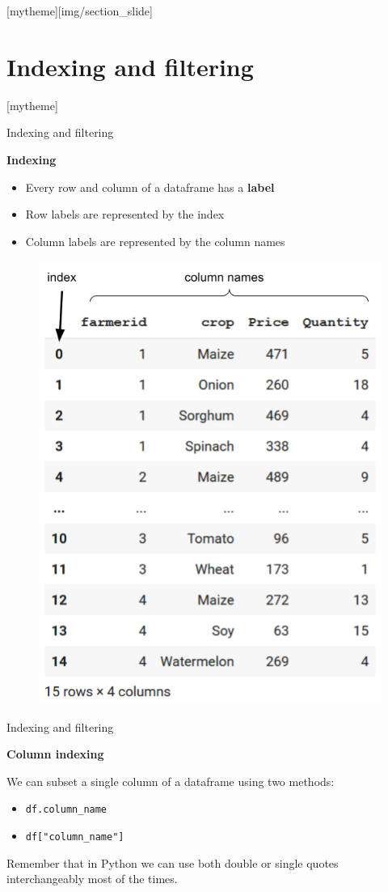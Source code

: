 \documentclass[aspectratio=169]{beamer}
\newcommand{\sectionpic}[2]{
	\setbeamertemplate{section page}[mytheme][#2]
	\section{#1}
	\setbeamertemplate{section page}[mytheme]
}
\begin{document}
\sectionpic{Indexing and filtering}{img/section_slide}

\begin{frame}{Indexing and filtering}

	\textbf{Indexing}

	\begin{multicols}{2}

		\begin{itemize}
			\item Every row and column of a dataframe has a \textbf{label}
			\item Row labels are represented by the index
			\item Column labels are represented by the column names
		\end{itemize}
		\begin{figure}
			\centering
			\includegraphics[width=0.71\linewidth]{img/dataframe_indices.png}
		\end{figure}

	\end{multicols}

\end{frame}

\begin{frame}{Indexing and filtering}

	\textbf{Column indexing}

	We can subset a single column of a dataframe using two methods:

	\begin{itemize}
		\item \texttt{df.column\_name}
		\item \texttt{df["column\_name"]}
	\end{itemize}

	Remember that in Python we can use both double or single quotes interchangeably most of the times.

\end{frame}
\end{document}
